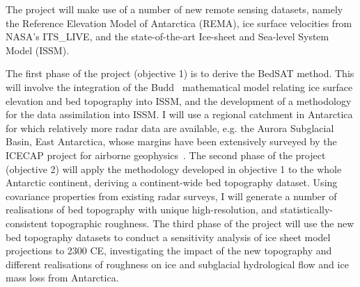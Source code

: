 \documentclass[10pt,a4paper]{article}
\begin{document}
The project will make use of a number of new remote sensing datasets, namely the Reference Elevation Model of Antarctica (REMA), ice surface velocities from NASA’s ITS\_LIVE, and the state-of-the-art Ice-sheet and Sea-level System Model (ISSM).

The first phase of the project (objective 1) is to derive the BedSAT method. This will involve the integration of the Budd~\cite{Budd_1970} mathematical model relating ice surface elevation and bed topography into ISSM, and the development of a methodology for the data assimilation into ISSM. I will use a regional catchment in Antarctica for which relatively more radar data are available, e.g. the Aurora Subglacial Basin, East Antarctica, whose margins have been extensively surveyed by the ICECAP project for airborne geophysics~\cite{Young2011}. The second phase of the project (objective 2) will apply the methodology developed in objective 1 to the whole Antarctic continent, deriving a continent-wide bed topography dataset. Using covariance properties from existing radar surveys, I will generate a number of realisations of bed topography with unique high-resolution, and statistically-consistent topographic roughness. The third phase of the project will use the new bed topography datasets to conduct a sensitivity analysis of ice sheet model projections to 2300 CE, investigating the impact of the new topography and different realisations of roughness on ice and subglacial hydrological flow and ice mass loss from Antarctica.\\
\end{document}
